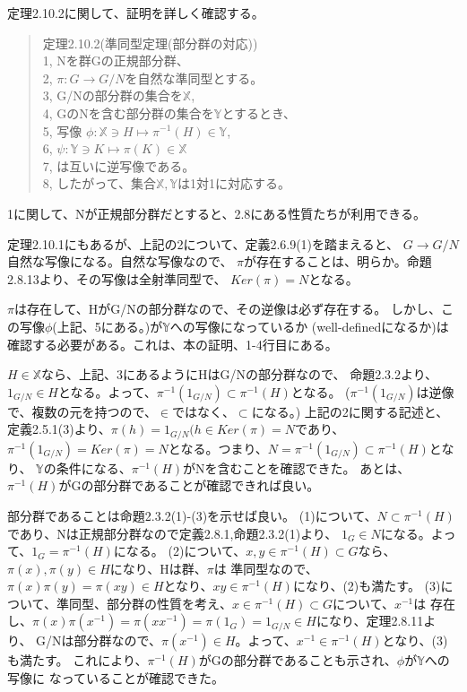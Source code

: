 \documentclass{jsarticle}
\begin{document}
定理2.10.2に関して、証明を詳しく確認する。

\begin{quote}
定理2.10.2(準同型定理(部分群の対応))\\
1, Nを群Gの正規部分群、\\
2, $\pi : G \rightarrow G/N$を自然な準同型とする。\\
3, G/Nの部分群の集合を$\mathbb{X}$,\\ 
4, GのNを含む部分群の集合を$\mathbb{Y}$とするとき、\\
5, 写像
$\phi : \mathbb{X} \ni H \mapsto \pi^{-1}(H) \in \mathbb{Y}$, \\
6, $\psi : \mathbb{Y} \ni K \mapsto \pi(K) \in \mathbb{X}$\\
7, は互いに逆写像である。\\
8, したがって、集合$\mathbb{X}, \mathbb{Y}$は1対1に対応する。
\end{quote}

1に関して、Nが正規部分群だとすると、2.8にある性質たちが利用できる。

定理2.10.1にもあるが、上記の2について、定義2.6.9(1)を踏まえると、
$G \rightarrow G/N$自然な写像になる。自然な写像なので、
$\pi$が存在することは、明らか。命題2.8.13より、その写像は全射準同型で、
$Ker(\pi) = N$となる。

$\pi$は存在して、HがG/Nの部分群なので、その逆像は必ず存在する。
しかし、この写像$\phi$(上記、5にある。)が$\mathbb{Y}$への写像になっているか
(well-definedになるか)は確認する必要がある。これは、本の証明、1-4行目にある。

$H \in \mathbb{X}$なら、上記、3にあるようにHはG/Nの部分群なので、
命題2.3.2より、$1_{G/N} \in H$となる。よって、$\pi^{-1}(1_{G/N}) \subset \pi^{-1}(H)$となる。
($\pi^{-1}(1_{G/N})$は逆像で、複数の元を持つので、$\in$ではなく、$\subset$になる。)
上記の2に関する記述と、定義2.5.1(3)より、$\pi(h) = 1_{G/N}(h \in Ker(\pi) = N$であり、
$\pi^{-1}(1_{G/N}) = Ker(\pi) = N$となる。つまり、$N = \pi^{-1}(1_{G/N}) \subset \pi^{-1}(H)$となり、
$\mathbb{Y}$の条件になる、$\pi^{-1}(H)$がNを含むことを確認できた。
あとは、$\pi^{-1}(H)$がGの部分群であることが確認できれば良い。

部分群であることは命題2.3.2(1)-(3)を示せば良い。
(1)について、$N \subset \pi^{-1}(H)$であり、Nは正規部分群なので定義2.8.1,命題2.3.2(1)より、
$1_G \in N$になる。よって、$1_G = \pi^{-1}(H)$になる。
(2)について、$x,y \in \pi^{-1}(H) \subset G$なら、$\pi(x), \pi(y) \in H$になり、Hは群、$\pi$は
準同型なので、$\pi(x)\pi(y) = \pi(xy) \in H$となり、$xy \in \pi^{-1}(H)$になり、(2)も満たす。
(3)について、準同型、部分群の性質を考え、$x \in \pi^{-1}(H) \subset G$について、$x^{-1}$は
存在し、$\pi(x)\pi(x^{-1}) = \pi(xx^{-1}) = \pi(1_G) = 1_{G/N} \in H$になり、定理2.8.11より、
G/Nは部分群なので、$\pi(x^{-1}) \in H$。よって、$x^{-1} \in \pi^{-1}(H)$となり、(3)も満たす。
これにより、$\pi^{-1}(H)$がGの部分群であることも示され、$\phi$が$\mathbb{Y}$への写像に
なっていることが確認できた。
\end{document}
